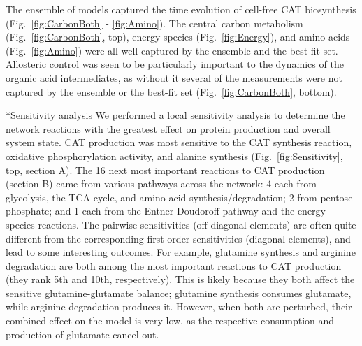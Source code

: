 \documentclass[12pt]{article}
\makeatletter
\renewcommand\subsection{\@startsection
	{subsection}{2}{0mm}
	{-0.05in}
	{-0.5\baselineskip}
	{\normalfont\normalsize\bfseries}}
\makeatother
\begin{document}
The ensemble of models captured the time evolution of cell-free CAT biosynthesis (Fig.~\ref{fig:CarbonBoth} - \ref{fig:Amino}).
The central carbon metabolism (Fig.~\ref{fig:CarbonBoth}, top), energy species (Fig.~\ref{fig:Energy}), and amino acids (Fig.~\ref{fig:Amino}) were all well captured by the ensemble and the best-fit set.
Allosteric control was seen to be particularly important to the dynamics of the organic acid intermediates, as without it several of the measurements were not captured by the ensemble or the best-fit set (Fig.~\ref{fig:CarbonBoth}, bottom).

\subsection*{Sensitivity analysis}
We performed a local sensitivity analysis to determine the network reactions with the greatest effect on protein production and overall system state.
CAT production was most sensitive to the CAT synthesis reaction, oxidative phosphorylation activity, and alanine synthesis (Fig.~\ref{fig:Sensitivity}, top, section A).
The 16 next most important reactions to CAT production (section B) came from various pathways across the network: 4 each from glycolysis, the TCA cycle, and amino acid synthesis/degradation; 2 from pentose phosphate; and 1 each from the Entner-Doudoroff pathway and the energy species reactions.
The pairwise sensitivities (off-diagonal elements) are often quite different from the corresponding first-order sensitivities (diagonal elements), and lead to some interesting outcomes.
For example, glutamine synthesis and arginine degradation are both among the most important reactions to CAT production (they rank 5th and 10th, respectively).
This is likely because they both affect the sensitive glutamine-glutamate balance; glutamine synthesis consumes glutamate, while arginine degradation produces it.
However, when both are perturbed, their combined effect on the model is very low, as the respective consumption and production of glutamate cancel out.
\end{document}
